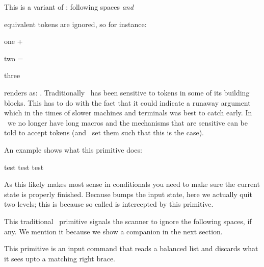 \stopnewprimitive

\startnewprimitive[title={\prm {ignorepars}}]

This is a variant of : following spaces {\em and} \type
{\par} equivalent tokens are ignored, so for instance:

\startbuffer
one + \ignorepars

two = \ignorepars \par
three
\stopbuffer

\typebuffer

renders as: \inlinebuffer. Traditionally \TEX\ has been sensitive to 
tokens in some of its building blocks. This has to do with the fact that it could
indicate a runaway argument which in the times of slower machines and terminals
was best to catch early. In \LUAMETATEX\ we no longer have long macros and the
mechanisms that are sensitive can be told to accept  tokens (and
\CONTEXT\ set them such that this is the case).

\stopnewprimitive

\startnewprimitive[title={\prm {ignorerest}}]

An example shows what this primitive does:

\startbuffer
\tolerant\def\foo[#1]#*[#2]%
  {1234
   \ifparameter#1\or\else
     \expandafter\ignorerest
   \fi
   /#1/
   \ifparameter#2\or\else
     \expandafter\ignorerest
   \fi
   /#2/ }

\foo test \foo[456] test \foo[456][789] test
\stopbuffer

\typebuffer

As this likely makes most sense in conditionals you need to make sure the current
state is properly finished. Because  bumps the input state,
here we actually quit two levels; this is because so called  is intercepted by this primitive.

\getbuffer

\stopnewprimitive

\startoldprimitive[title={\prm {ignorespaces}}]

This traditional \TEX\ primitive signals the scanner to ignore the following
spaces, if any. We mention it because we show a companion in the next section.

\stopoldprimitive

\startnewprimitive[title={\prm {ignoretokens}}]

This primitive is an input command that reads a balanced list and discards what
it sees upto a matching right brace.

